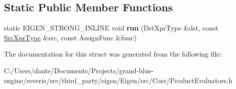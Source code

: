 \subsection*{Static Public Member Functions}
\begin{DoxyCompactItemize}
\item 
\mbox{\label{struct_eigen_1_1internal_1_1_assignment_3_01_dst_xpr_type_00_01_cwise_binary_op_3_01internal_1_1eb29cc77263dc530639098c389efc225_a26c4bececb04fddf315034d1a4250f30}} 
static E\+I\+G\+E\+N\+\_\+\+S\+T\+R\+O\+N\+G\+\_\+\+I\+N\+L\+I\+NE void {\bfseries run} (Dst\+Xpr\+Type \&dst, const \mbox{\hyperlink{class_eigen_1_1_cwise_binary_op}{Src\+Xpr\+Type}} \&src, const Assign\+Func \&func)
\end{DoxyCompactItemize}


The documentation for this struct was generated from the following file\+:\begin{DoxyCompactItemize}
\item 
C\+:/\+Users/dante/\+Documents/\+Projects/grand-\/blue-\/engine/reverie/src/third\+\_\+party/eigen/\+Eigen/src/\+Core/Product\+Evaluators.\+h\end{DoxyCompactItemize}

